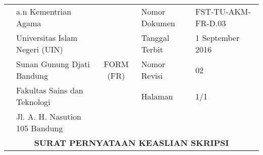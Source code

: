 

\begin{table}
\begin{footnotesize}
\flushright
\begin{tabular}{|c|l|c|l l|}
\hline \hline
&a.n Kementrian Agama&&Nomor Dokumen& FST-TU-AKM-FR-D.03\\\cline{4-5}
&Universitas Islam Negeri (UIN)&&Tanggal Terbit& 1 September 2016\\\cline{4-5}
&Sunan Gunung Djati Bandung&\large{FORM (FR)}&Nomor Revisi& 02\\\cline{4-5}
&Fakultas Sains dan Teknologi&&Halaman& 1/1\\
&Jl. A. H. Nasution 105 Bandung&&&\\\hline
\multicolumn{5}{c}{\bf SURAT PERNYATAAN KEASLIAN SKRIPSI}\cr
\hline
\end{tabular}
\end{footnotesize}
\end{table}

